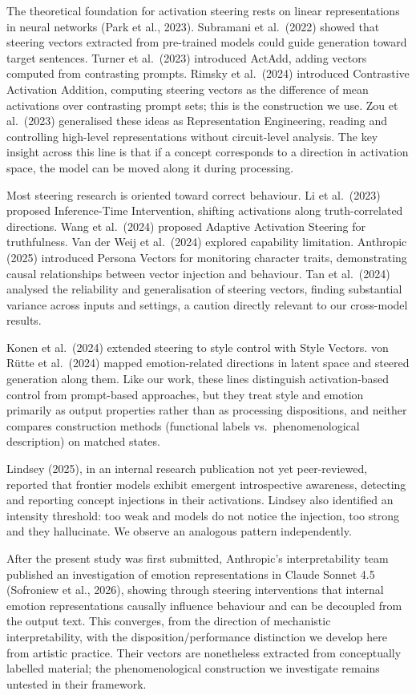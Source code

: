 \documentclass[11pt,a4paper]{article}
\begin{document}
The theoretical foundation for activation steering rests on linear representations in neural networks (Park et al., 2023). Subramani et al.~(2022) showed that steering vectors extracted from pre-trained models could guide generation toward target sentences. Turner et al.~(2023) introduced ActAdd, adding vectors computed from contrasting prompts. Rimsky et al.~(2024) introduced Contrastive Activation Addition, computing steering vectors as the difference of mean activations over contrasting prompt sets; this is the construction we use. Zou et al.~(2023) generalised these ideas as Representation Engineering, reading and controlling high-level representations without circuit-level analysis. The key insight across this line is that if a concept corresponds to a direction in activation space, the model can be moved along it during processing.

Most steering research is oriented toward correct behaviour. Li et al.~(2023) proposed Inference-Time Intervention, shifting activations along truth-correlated directions. Wang et al.~(2024) proposed Adaptive Activation Steering for truthfulness. Van der Weij et al.~(2024) explored capability limitation. Anthropic (2025) introduced Persona Vectors for monitoring character traits, demonstrating causal relationships between vector injection and behaviour. Tan et al.~(2024) analysed the reliability and generalisation of steering vectors, finding substantial variance across inputs and settings, a caution directly relevant to our cross-model results.

Konen et al.~(2024) extended steering to style control with Style Vectors. von Rütte et al.~(2024) mapped emotion-related directions in latent space and steered generation along them. Like our work, these lines distinguish activation-based control from prompt-based approaches, but they treat style and emotion primarily as output properties rather than as processing dispositions, and neither compares construction methods (functional labels vs.~phenomenological description) on matched states.

Lindsey (2025), in an internal research publication not yet peer-reviewed, reported that frontier models exhibit emergent introspective awareness, detecting and reporting concept injections in their activations. Lindsey also identified an intensity threshold: too weak and models do not notice the injection, too strong and they hallucinate. We observe an analogous pattern independently.

After the present study was first submitted, Anthropic's interpretability team published an investigation of emotion representations in Claude Sonnet 4.5 (Sofroniew et al., 2026), showing through steering interventions that internal emotion representations causally influence behaviour and can be decoupled from the output text. This converges, from the direction of mechanistic interpretability, with the disposition/performance distinction we develop here from artistic practice. Their vectors are nonetheless extracted from conceptually labelled material; the phenomenological construction we investigate remains untested in their framework.
\end{document}

